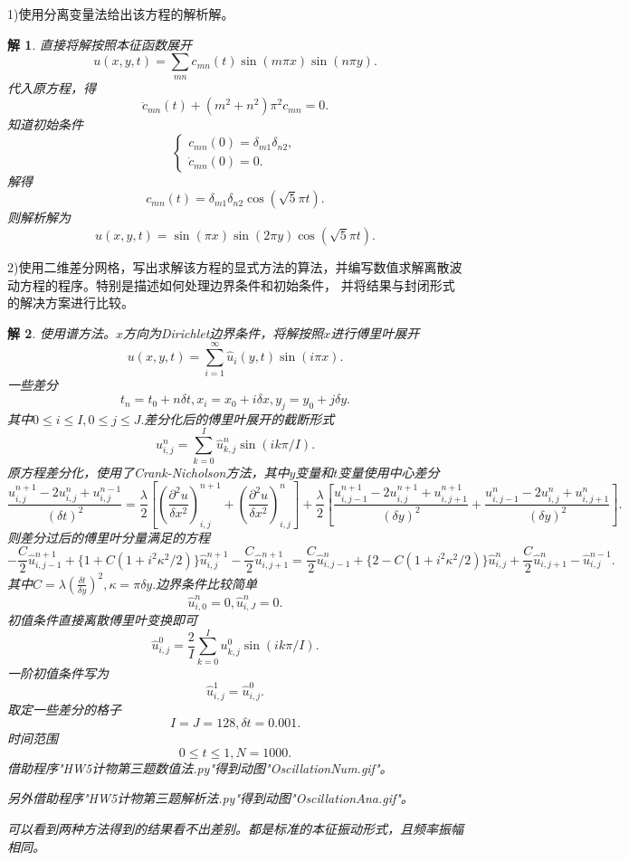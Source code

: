 \documentclass[10pt]{ctexart}
\newtheorem*{solution}{解}
\begin{document}
1)使用分离变量法给出该方程的解析解。
\begin{solution}
    直接将解按照本征函数展开
    $$u(x,y,t)=\sum\limits_{mn}c_{mn}(t)\sin{(m\pi x)}\sin{(n\pi y)}.$$
    代入原方程，得
    $$\ddot{c}_{mn}(t)+(m^2+n^2)\pi^2c_{mn}=0.$$
    知道初始条件
    $$\begin{cases}
        c_{mn}(0)=\delta_{m1}\delta_{n2},\\
        \dot{c}_{mn}(0)=0.
    \end{cases}$$
    解得
    $$c_{mn}(t)=\delta_{m1}\delta_{n2}\cos{(\sqrt{5}\pi t)}.$$
    则解析解为
    $$u(x,y,t)=\sin{(\pi x)}\sin{(2\pi y)}\cos{(\sqrt{5}\pi t)}.$$
\end{solution}
2)使用二维差分网格，写出求解该方程的显式方法的算法，并编写数值求解离散波动方程的程序。特别是描述如何处理边界条件和初始条件，
并将结果与封闭形式的解决方案进行比较。
\begin{solution}
    使用谱方法。$x$方向为Dirichlet边界条件，将解按照$x$进行傅里叶展开
    $$u(x,y,t)=\sum\limits_{i=1}^{\infty}\hat{u}_{i}(y,t)\sin{(i\pi x)}.$$
    一些差分
    $$t_n=t_0+n\delta t,x_i=x_0+i\delta x,y_j=y_0+j\delta y.$$
    其中$0\leq i\leq I,0\leq j \leq J.$差分化后的傅里叶展开的截断形式
    $$u_{i,j}^{n}=\sum\limits_{k=0}^{I}\hat{u}_{k,j}^{n}\sin{(ik\pi/I)}.$$
    原方程差分化，使用了Crank-Nicholson方法，其中$y$变量和$t$变量使用中心差分
    $$\frac{u_{i,j}^{n+1}-2u_{i,j}^{n}+u_{i,j}^{n-1}}{(\delta t)^2}=\frac{\lambda}{2}\left[\left(\frac{\partial^2u}{\delta x^2}\right)_{i,j}^{n+1}+\left(\frac{\partial^2u}{\delta x^2}\right)_{i,j}^{n}\right]+\frac{\lambda}{2}\left[\frac{u_{i,j-1}^{n+1}-2u_{i,j}^{n+1}+u_{i,j+1}^{n+1}}{(\delta y)^2}+\frac{u_{i,j-1}^{n}-2u_{i,j}^{n}+u_{i,j+1}^{n}}{(\delta y)^2}\right].$$
    则差分过后的傅里叶分量满足的方程
    $$-\frac{C}{2}\hat{u}_{i,j-1}^{n+1}+\{1+C(1+i^2\kappa^2/2)\}\hat{u}_{i,j}^{n+1}-\frac{C}{2}\hat{u}_{i,j+1}^{n+1}=\frac{C}{2}\hat{u}_{i,j-1}^{n}+\{2-C(1+i^2\kappa^2/2)\}\hat{u}_{i,j}^{n}+\frac{C}{2}\hat{u}_{i,j+1}^{n}-\hat{u}_{i,j}^{n-1}.$$
    其中$C=\lambda\left(\frac{\delta t}{\delta y}\right)^2,\kappa=\pi\delta y.$边界条件比较简单
    $$\hat{u}_{i,0}^{n}=0,\hat{u}_{i,J}^{n}=0.$$
    初值条件直接离散傅里叶变换即可
    $$\hat{u}_{i,j}^{0}=\frac{2}{I}\sum\limits_{k=0}^{I}u_{k,j}^{0}\sin{(ik\pi/I).}$$
    一阶初值条件写为
    $$\hat{u}_{i,j}^{1}=\hat{u}_{i,j}^{0}.$$
    取定一些差分的格子
    $$I=J=128,\delta t=0.001.$$
    时间范围
    $$0\leq t \leq 1,N=1000.$$
    借助程序"HW5计物第三题数值法.py"得到动图"OscillationNum.gif"。

    另外借助程序"HW5计物第三题解析法.py"得到动图"OscillationAna.gif"。

    可以看到两种方法得到的结果看不出差别。都是标准的本征振动形式，且频率振幅相同。
\end{solution}
\end{document}
